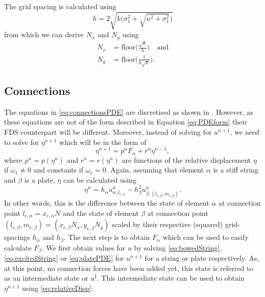 \documentclass{article}
\begin{document}
The grid spacing is calculated using \cite{Bilbao2009:ModularPercussion}
\begin{equation}\label{eq:stabilityPlate}
h = 2\sqrt{k\bigg(\sigma_1^2 + \sqrt{\kappa^2+ \sigma_1^2}\bigg)}
\end{equation}
from which we can derive $N_x$ and $N_y$ using
\begin{align}
    N_x &= \text{floor}\Bigg(\frac{\sqrt{a}}{h}\Bigg) \quad \text{and}\\
    N_y &= \text{floor}\Bigg(\frac{1}{h\sqrt{a}}\Bigg).
\end{align}

\subsection{Connections}
The equations in \eqref{eq:connectionsPDE} are discretised as shown in \cite{Bilbao2009:ModularPercussion}. However, as these equations are not of the form described in Equation \eqref{eq:PDEform} their FDS counterpart will be different. Moreover, instead of solving for $u^{n+1}$, we need to solve for $\eta^{n+1}$ which will be in the form of
\begin{equation}\label{eq:etaNext}
    \eta^{n+1} = p^nF_\alpha + r^n\eta^{n-1},
\end{equation}
where $p^n = p(\eta^n)$ and $r^n = r(\eta^n)$ are functions of the relative displacement $\eta$ if $\omega_1 \neq 0$ and constants if $\omega_1 = 0$. Again, assuming that element $\alpha$ is a stiff string and $\beta$ is a plate, $\eta$ can be calculated using
\begin{equation}\label{eq:relativeDisp}
    \eta^n = h_\alpha u_{\alpha, l_{\text{c},\alpha}}^n - h_\beta^2 u_{\beta,(l_{\text{c},\beta}, m_{\text{c},\beta})}^n.
\end{equation}
In other words, this is the difference between the state of element $\alpha$ at connection point $l_{\text{c},\alpha} = x_{\text{c},\alpha}N$ and the state of element $\beta$ at connection point $(l_{\text{c},\beta}, m_{\text{c},\beta}) = (x_{\text{c},\beta}N_x, y_{\text{c},\beta}N_y)$ scaled by their respective (squared) grid-spacings $h_\alpha$ and $h_\beta$. %
The next step is to obtain $F_\alpha$ which can be used to easily calculate $F_\beta$. We first obtain values for $u$ by solving \eqref{eq:bowedString}, \eqref{eq:excitedString} or \eqref{eq:platePDE} for $u^{n+1}$ for a string or plate respectively. As, at this point, no connection forces have been added yet, this state is referred to as an intermediate state or $u^\text{I}$. This intermediate state can be used to obtain $\eta^{n+1}$ using \eqref{eq:relativeDisp}:
\end{document}
